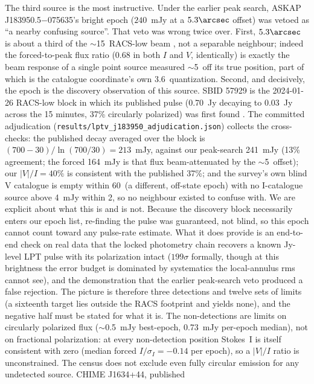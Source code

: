 \documentclass[twocolumn]{aastex631}
\newcommand{\code}[1]{\texttt{#1}}
\begin{document}
The third source is the most instructive. Under the earlier peak search, ASKAP
J183950.5$-$075635's bright epoch ($240$~mJy at a $5.3\arcsec$ offset) was vetoed as ``a
nearby confusing source''. That veto was wrong twice over. First, $5.3\arcsec$ is about a
third of the $\sim$15\arcsec\ RACS-low beam \citep{mcconnell2020}, not a separable
neighbour; indeed the forced-to-peak flux ratio (0.68 in both $I$ and $V$, identically) is
exactly the beam response of a single point source measured $\sim$5\arcsec\ off its true
position, part of which is the catalogue coordinate's own 3.6\arcsec\ quantization. Second,
and decisively, the epoch is the discovery observation of this source. SBID 57929 is
the 2024-01-26 RACS-low block in which its published pulse (0.70~Jy decaying to 0.03~Jy
across the 15 minutes, 37\% circularly polarized) was first found \citep{lee2025}. The
committed adjudication (\code{results/lptv\_j183950\_adjudication.json}) collects the
cross-checks: the published decay averaged over the block is
$(700-30)/\ln(700/30) = 213$~mJy, against our peak-search 241~mJy (13\% agreement; the forced
164~mJy is that flux beam-attenuated by the $\sim$5\arcsec\ offset); our $|V|/I = 40\%$ is
consistent with the published 37\%; and the survey's own blind V catalogue is empty within
60\arcsec\ (a different, off-state epoch) with no I-catalogue source above 4~mJy within
2\arcmin, so no neighbour existed to confuse with. We are explicit about what this is and is
not. Because the discovery block necessarily enters our epoch list, re-finding the pulse was
guaranteed, not blind, so this epoch cannot count toward any pulse-rate estimate. What it
does provide is an end-to-end check on real data that the locked photometry chain recovers a
known Jy-level LPT pulse with its polarization intact ($199\sigma$ formally, though at this
brightness the error budget is dominated by systematics the local-annulus rms cannot see),
and the demonstration that the earlier peak-search veto produced a false rejection. The
picture is therefore three detections and twelve sets of limits (a sixteenth target lies
outside the RACS footprint and yields none), and the negative half must be stated for what
it is. The non-detections are limits on circularly polarized flux ($\sim$0.5~mJy
best-epoch, 0.73~mJy per-epoch median), not on fractional polarization: at every
non-detection position Stokes~I is itself consistent with zero (median forced
$I/\sigma_I = -0.14$ per epoch), so a $|V|/I$ ratio is unconstrained. The census does not
exclude even fully circular emission for any undetected source. CHIME J1634+44, published
\end{document}
